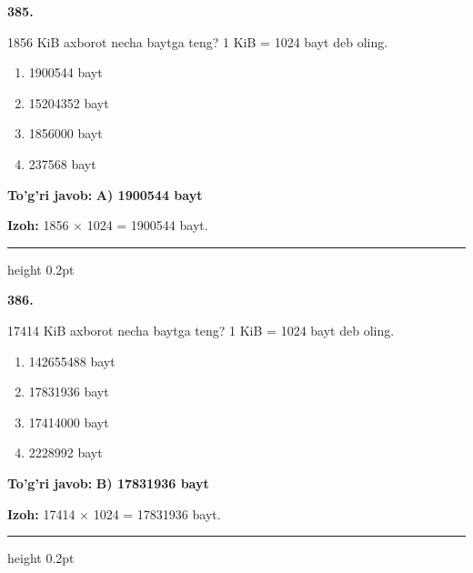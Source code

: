 \documentclass[10pt,a4paper,oneside]{article}
\begin{document}
\noindent\textbf{\color{ink}385.}
\par
1856 KiB axborot necha baytga teng? 1 KiB = 1024 bayt deb oling.
\begin{enumerate}[label=\Alph*),leftmargin=9mm]
\item 1900544 bayt
\item 15204352 bayt
\item 1856000 bayt
\item 237568 bayt
\end{enumerate}
\begin{tcolorbox}[enhanced,breakable,colback=teal!4,colframe=teal!50!black,boxrule=0.5pt,arc=1.1mm,left=3mm,right=3mm,top=1.7mm,bottom=1.7mm,before skip=2mm,after skip=2mm]
\textbf{\color{teal}To'g'ri javob:} \textbf{A) 1900544 bayt}
\par\smallskip
\textbf{Izoh:} 1856 \ensuremath{\times} 1024 = 1900544 bayt.
\end{tcolorbox}
\vspace{2mm}\hrule height 0.2pt \vspace{3mm}

\noindent\textbf{\color{ink}386.}
\par
17414 KiB axborot necha baytga teng? 1 KiB = 1024 bayt deb oling.
\begin{enumerate}[label=\Alph*),leftmargin=9mm]
\item 142655488 bayt
\item 17831936 bayt
\item 17414000 bayt
\item 2228992 bayt
\end{enumerate}
\begin{tcolorbox}[enhanced,breakable,colback=teal!4,colframe=teal!50!black,boxrule=0.5pt,arc=1.1mm,left=3mm,right=3mm,top=1.7mm,bottom=1.7mm,before skip=2mm,after skip=2mm]
\textbf{\color{teal}To'g'ri javob:} \textbf{B) 17831936 bayt}
\par\smallskip
\textbf{Izoh:} 17414 \ensuremath{\times} 1024 = 17831936 bayt.
\end{tcolorbox}
\vspace{2mm}\hrule height 0.2pt \vspace{3mm}
\end{document}
